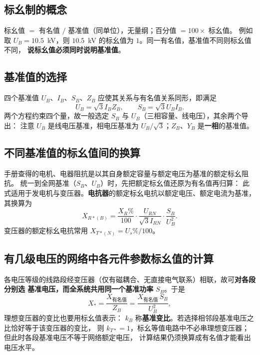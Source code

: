 \subsection{标幺制的概念}

标幺值 $=$ 有名值 $/$ 基准值（同单位），无量纲；百分值 $=100\times$ 标幺值。
例如取 $U_B=10.5$~kV，则 $10.5$~kV 的标幺值为 $1$。同一有名值，基准值不同则标幺值不同，
\textbf{说标幺值必须同时说明基准值}。

\subsection{基准值的选择}

四个基准值 $U_B$、$I_B$、$S_B$、$Z_B$ 应使其关系与有名值关系同形，即满足
\begin{equation}
  U_B=\sqrt{3}I_BZ_B,\qquad S_B=\sqrt{3}U_BI_B .
\end{equation}
两个方程约束四个量，故一般选定 $S_B$ 与 $U_B$（三相容量、线电压），其余两个导出：
注意 $U_B$ 是线电压基准，相电压基准为 $U_B/\sqrt{3}$；$Z_B$、$Y_B$ 是\textbf{一相}的基准值。

\subsection{不同基准值的标幺值间的换算}

手册查得的电机、电器阻抗是以其自身额定容量与额定电压为基准的额定标幺阻抗。
统一到全网基准（$S_B$、$U_B$）时，先把额定标幺值还原为有名值再归算：
此式适用于发电机与变压器。\textbf{电抗器}的额定标幺电抗以额定电压、额定电流为基准，
其换算为
\begin{equation}
  X_{R*(B)}=\frac{X_R\%}{100}\cdot\frac{U_{RN}}{\sqrt{3}I_{RN}}\cdot\frac{S_B}{U_B^{2}} .
\end{equation}
变压器的额定标幺电抗常用 $X_{T*(N)}=U_s\%/100$。

\subsection{有几级电压的网络中各元件参数标幺值的计算}

各电压等级的线路段经变压器（仅有磁耦合、无直接电气联系）相联，故可\textbf{对各段分别选
基准电压，而全系统共用同一个基准功率} $S_B$。于是
\begin{equation}
  X_{*}=\frac{X_{\text{有名值}}}{Z_B}=\frac{X_{\text{有名值}}\,S_B}{U_B^{2}} ,
\end{equation}
理想变压器的变比也要用标幺值表示：
$k_B$ 称\textbf{基准变比}。若选择相邻段基准电压之比恰好等于该变压器的变比，
则 $k_{T*}=1$，标幺等值电路中不必串理想变压器；但此时各段基准电压不等于网络额定电压，
计算结果仍须换算成有名值才能看出电压水平。

